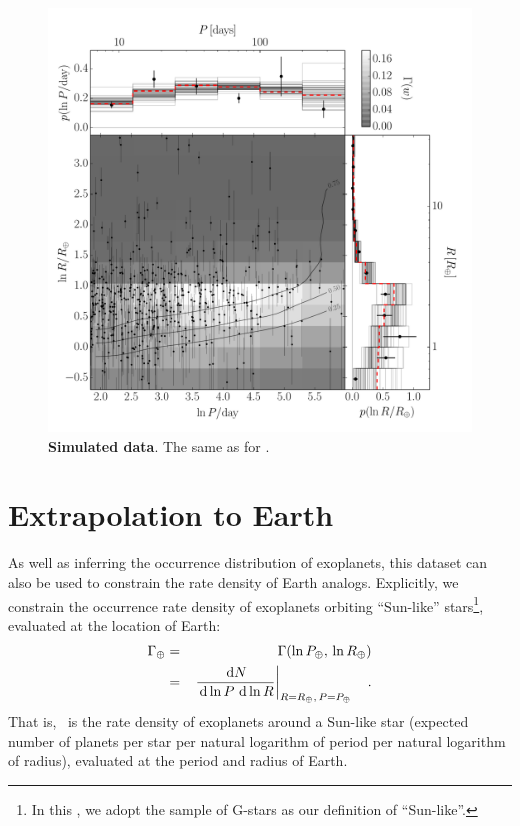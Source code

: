 \begin{figure}[p]
\begin{center}
\includegraphics[width=\textwidth]{figures/exopop/simulation/results.pdf}
\end{center}
\caption[The inferred planet population for the simulated catalog \modelb]{%
{\bf Simulated data}.
The same as  for \modelb.
}
\end{figure}

\section{Extrapolation to Earth}

As well as inferring the occurrence distribution of exoplanets, this dataset
can also be used to constrain the rate density of Earth analogs.
Explicitly, we constrain the occurrence rate density of exoplanets orbiting
``Sun-like'' stars\footnote{In this \paper, we adopt the \citet{Petigura:2013}
sample of G-stars as our definition of ``Sun-like''.}, evaluated at the
location of Earth:
\begin{eqnarray}\eqlabel{gammaearth}
\gammaearth &=& \rate (\ln\period_\oplus,\,\ln\radius_\oplus) \\
&=&
\left.\frac{\dd N}{\dd\ln\period\,\dd\ln\radius}\right|
_{\radius=\radius_\oplus,\,\period=\period_\oplus}\quad.
\end{eqnarray}
That is, \gammaearth\ is the rate density of exoplanets around a Sun-like
star (expected number of planets per star per natural logarithm of period per
natural logarithm of radius), evaluated at the period and radius of Earth.

